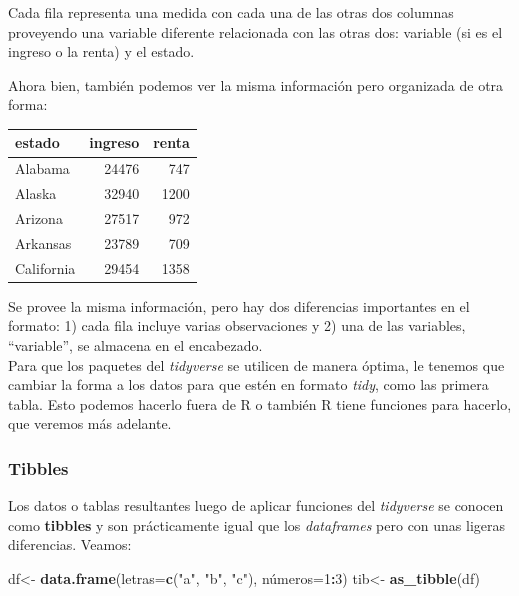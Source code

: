 \documentclass[
]{book}
\newenvironment{Shaded}{\begin{snugshade}}{\end{snugshade}}
\newcommand{\AttributeTok}[1]{\textcolor[rgb]{0.13,0.29,0.53}{#1}}
\newcommand{\DecValTok}[1]{\textcolor[rgb]{0.00,0.00,0.81}{#1}}
\newcommand{\FunctionTok}[1]{\textcolor[rgb]{0.13,0.29,0.53}{\textbf{#1}}}
\newcommand{\NormalTok}[1]{#1}
\newcommand{\OtherTok}[1]{\textcolor[rgb]{0.56,0.35,0.01}{#1}}
\newcommand{\SpecialCharTok}[1]{\textcolor[rgb]{0.81,0.36,0.00}{\textbf{#1}}}
\newcommand{\StringTok}[1]{\textcolor[rgb]{0.31,0.60,0.02}{#1}}
\begin{document}
Cada fila representa una medida con cada una de las otras dos columnas proveyendo una variable diferente relacionada con las otras dos: variable (si es el ingreso o la renta) y el estado.

Ahora bien, también podemos ver la misma información pero organizada de otra forma:

\begin{tabular}{l|r|r}
\hline
estado & ingreso & renta\\
\hline
Alabama & 24476 & 747\\
\hline
Alaska & 32940 & 1200\\
\hline
Arizona & 27517 & 972\\
\hline
Arkansas & 23789 & 709\\
\hline
California & 29454 & 1358\\
\hline
\end{tabular}

Se provee la misma información, pero hay dos diferencias importantes en el formato: 1) cada fila incluye varias observaciones y 2) una de las variables, ``variable'', se almacena en el encabezado.\\
Para que los paquetes del \emph{tidyverse} se utilicen de manera óptima, le tenemos que cambiar la forma a los datos para que estén en formato \emph{tidy}, como las primera tabla.
Esto podemos hacerlo fuera de R o también R tiene funciones para hacerlo, que veremos más adelante.

\subsubsection{Tibbles}\label{tibbles}

Los datos o tablas resultantes luego de aplicar funciones del \emph{tidyverse} se conocen como \textbf{tibbles} y son prácticamente igual que los \emph{dataframes} pero con unas ligeras diferencias.
Veamos:\\

\begin{Shaded}
\begin{Highlighting}[]
\NormalTok{df}\OtherTok{\textless{}{-}} \FunctionTok{data.frame}\NormalTok{(}\AttributeTok{letras=}\FunctionTok{c}\NormalTok{(}\StringTok{"a"}\NormalTok{, }\StringTok{"b"}\NormalTok{, }\StringTok{"c"}\NormalTok{),}
\NormalTok{                números}\OtherTok{=}\DecValTok{1}\SpecialCharTok{:}\DecValTok{3}\NormalTok{)}
\NormalTok{tib}\OtherTok{\textless{}{-}} \FunctionTok{as\_tibble}\NormalTok{(df)}
\end{Highlighting}
\end{Shaded}
\end{document}
